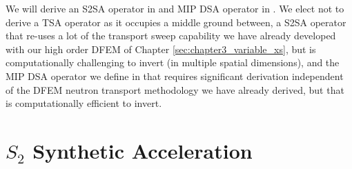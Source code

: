 We will derive an S2SA operator in  and MIP DSA operator in .  
We elect not to derive a TSA operator as it occupies a middle ground between, a S2SA operator that re-uses a lot of the transport sweep capability we have already developed with our high order DFEM of Chapter \ref{sec:chapter3_variable_xs}, but is computationally challenging to invert (in multiple spatial dimensions), and the MIP DSA operator we define in  that requires significant derivation independent of the DFEM neutron transport methodology we have already derived, but that is computationally efficient to invert.

\section{$S_2$ Synthetic Acceleration}
\label{sec:s2sa}

